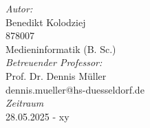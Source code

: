 \begin{titlepage}
    \begin{center}
        \textit{Autor:} \\
        Benedikt Kolodziej \\
        878007 \\
        Medieninformatik (B. Sc.) \\[1cm]

        \textit{Betreuender Professor:} \\
        Prof. Dr. Dennis Müller\\
        dennis.mueller@hs-duesseldorf.de \\[1cm]

        \textit{Zeitraum} \\
        28.05.2025 - xy
    \end{center}

    \vspace{3cm} %


\end{titlepage}

